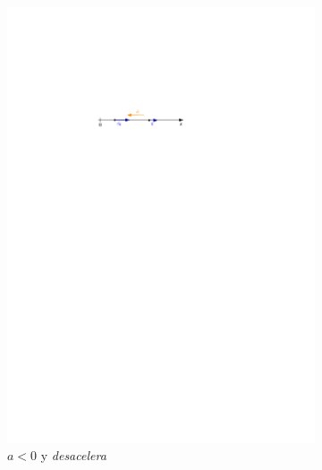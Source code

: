 \begin{figure}[H]
\begin{subfigure}{0.5\textwidth}
 	\includegraphics[width=.9\linewidth]{img/acelera2.pdf}
	\caption{$a<0$ y \textit{desacelera}}	
\end{subfigure}
 \begin{subfigure}{0.5\textwidth}
    \centering

\end{subfigure}
\end{figure}
